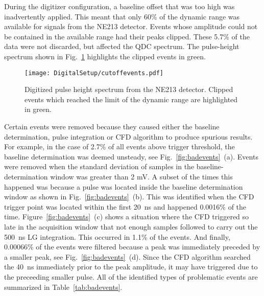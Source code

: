 \documentclass[main.tex]{subfiles}
\begin{document}
During the digitizer configuration, a baseline offset that was too high was inadvertently applied. This meant that only 60\% of the dynamic range was available for signals from the NE213 detector. Events whose amplitude could not be contained in the available range had their peaks clipped. These 5.7\% of the data were not discarded, but affected the QDC spectrum. The pulse-height spectrum shown in Fig.~\ref{fig:cutoffevents} highlights the clipped events in green.
\begin{figure}[hb!]
    \centering
        \texttt{[image: DigitalSetup/cutoffevents.pdf]}
        \caption[Digitized pulse-height spectrum from the NE213 detector.]{Digitized pulse height spectrum from the NE213 detector. Clipped events which reached the limit of the dynamic range are highlighted in green.}
    \label{fig:cutoffevents} 
\end{figure}

Certain events were removed because they caused either the baseline determination, pulse integration or CFD algorithm to produce spurious results. For example, in the case of 2.7\% of all events above trigger threshold, the baseline determination was deemed unsteady, see Fig.~\ref{fig:badevents}~(a). Events were removed when the standard deviation of samples in the baseline-determination window was greater than 2 mV. A subset of the times this happened was because a pulse was located inside the baseline determination window as shown in Fig.~\ref{fig:badevents}~(b). This was identified when the CFD trigger point was located within the first \SI{20}{ns} and happened 0.0016\% of the time. Figure~\ref{fig:badevents}~(c) shows a situation where the CFD triggered so late in the acquisition window that not enough samples followed to carry out the \SI{500}{\nano\second} LG integration. This occurred in 1.1\% of the events. And finally, 0.00066\% of the events were filtered because a peak was immediately  preceded by a smaller peak, see Fig.~\ref{fig:badevents}~(d). Since the CFD algorithm searched the \SI{40}{ns} immediately prior to the peak amplitude, it may have triggered due to the preceeding smaller pulse. All of the identified types of problematic events are summarized in Table~\ref{tab:badevents}.
\end{document}
